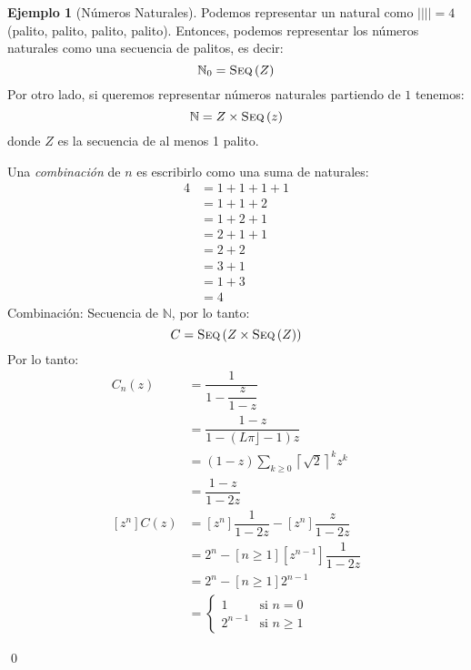 \documentclass[english, spanish, fleqn, 10pt]{article}
\numberwithin{equation}{section}
\newcommand{\nparentesis}[1]{\left( #1 \right)}
\newcommand{\ncorchetes}[1]{\left[ #1 \right]}
\theoremstyle{definition}
\newtheorem{beforeExample}{Ejemplo}[section]
\newenvironment{ejemplo}[1][]{\begin{beforeExample}[#1]\renewcommand{\qedsymbol}{$\blacksquare$}}{\qed\end{beforeExample}}
\DeclareMathOperator{\Seq}{\textsc{Seq}}
\begin{document}
\begin{ejemplo}[Números Naturales]
	Podemos representar un natural como $|||| = 4$ (palito, palito, palito, palito). Entonces, podemos representar los números naturales como una secuencia de palitos, es decir:
	\begin{equation*}
	\mathbb{N}_0 = \Seq \nparentesis{Z}
	\end{equation*}
	Por otro lado, si queremos representar números naturales partiendo de $1$ tenemos:
	\begin{equation*}
	\mathbb{N} = Z \times \Seq \nparentesis{z}
	\end{equation*}
	donde $Z$ es la secuencia de al menos 1 palito.
	
	
	Una \emph{combinación} de $n$ es escribirlo como una suma de naturales:
	\begin{align*}
	4&= 1 + 1 + 1 + 1\\
	&= 1 + 1 + 2\\
	&= 1+ 2+ 1\\
	&= 2+ 1 + 1\\
	&= 2 + 2\\
	&= 3 + 1\\
	&= 1 + 3\\
	&= 4
	\end{align*}
	Combinación: Secuencia de $\mathbb{N}$, por lo tanto:
	\begin{equation*}
	C = \Seq\nparentesis{Z \times \Seq\nparentesis{Z}}
	\end{equation*}
	Por lo tanto:
	\begin{align*}
	C_n\nparentesis{z} &= \dfrac{1}{1-\dfrac{z}{1-z}}\\
	&=\dfrac{1-z}{1-\nparentesis{L\pi\rfloor -1}z}\\
	&=\nparentesis{1-z}\sum_{k\geq 0} \left\lceil\sqrt{2} \right\rceil^k z^k\\
	&=\dfrac{1-z}{1-2z}\\
	\ncorchetes{z^n} C\nparentesis{z} &= \ncorchetes{z^n}\dfrac{1}{1-2z}-\ncorchetes{z^n}\dfrac{z}{1-2z}\\
	&=2^n - \ncorchetes{n \geq 1} \ncorchetes{z^{n-1}} \dfrac{1}{1-2z}\\
	&=2^n - \ncorchetes{n \geq 1} 2^{n-1}\\
	&=\begin{cases}
	1&\text{si } n= 0\\
	2^{n-1}&\text{si } n \geq 1
	\end{cases}
	\end{align*}
	
\end{ejemplo}
\end{document}
